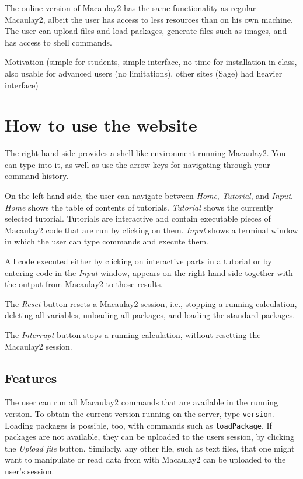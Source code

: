 \documentclass[]{article}
\begin{document}
The online version of Macaulay2 has the same functionality as regular
Macaulay2, albeit the user has access to less resources than on his
own machine. The user can upload files and load packages, generate
files such as images, and has access to shell commands.


Motivation (simple for students, simple interface, no time for
installation in class, also usable for advanced users (no
limitations), other sites (Sage) had heavier interface)


\section{How to use the website}
The right hand side provides a shell like environment running
Macaulay2. You can type into it, as well as use the arrow keys for
navigating through your command history.

On the left hand side, the user can navigate between {\it Home}, {\it
  Tutorial}, and {\it Input}. {\it Home} shows the table of contents
of tutorials. {\it Tutorial} shows the currently selected
tutorial. Tutorials are interactive and contain executable pieces of
Macaulay2 code that are run by clicking on them. {\it Input} shows a
terminal window in which the user can type commands and execute them.

All code executed either by clicking on interactive parts in a
tutorial or by entering code in the {\it Input} window, appears on the
right hand side together with the output from Macaulay2 to those
results.

The {\it Reset} button resets a Macaulay2 session, i.e., stopping a
running calculation, deleting all variables, unloading all packages,
and loading the standard packages.

The {\it Interrupt} button stops a running calculation, without
resetting the Macaulay2 session.

\subsection{Features}

The user can run all Macaulay2 commands that are available in the
running version. To obtain the current version running on the server,
type {\tt version}. Loading packages is possible, too, with commands
such as {\tt loadPackage}. If packages are not available, they can be
uploaded to the users session, by clicking the {\it Upload file}
button. Similarly, any other file, such as text files, that one might
want to manipulate or read data from with Macaulay2 can be uploaded to
the user's session.
\end{document}

